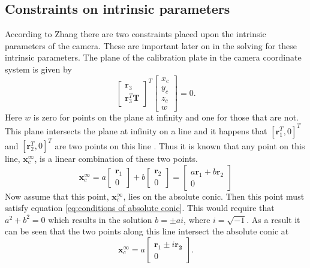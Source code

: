 \documentclass[12pt,oneside,openany,a4paper, %
english, %
masters-t, goldenblock]{usthesis}
\begin{document}
\subsection{Constraints on intrinsic parameters}
\label{sec: intrinsic constraints}
According to Zhang \cite{emerging} there are two constraints placed upon the intrinsic parameters of the camera. These are important later on in the solving for these intrinsic parameters. The plane of the calibration plate in the camera coordinate system is given by \cite{emerging} 
\begin{equation}
  \begin{bmatrix}
  \bm{r}_3 \\
  \bm{r}_3^T \bm{T}
  \end{bmatrix}^T
  \begin{bmatrix}
  x_c \\
  y_c \\
  z_c \\
  w
  \end{bmatrix} = 0.
\end{equation}
Here $w$ is zero for points on the plane at infinity and one for those that are not. This plane intersects the plane at infinity on a line and it happens that $[\bm{r}_1^T, 0]^T$ and $[\bm{r}_2^T, 0]^T$ are two points on this line \cite{emerging}. Thus it is known that any point on this line, $\bm{x}_c^{\infty}$, is a linear combination of these two points.
\begin{equation}
  \bm{x}_c^{\infty} = a \begin{bmatrix}
  \bm{r}_1 \\
  0
  \end{bmatrix} + b
  \begin{bmatrix}
  \bm{r}_2 \\
  0
  \end{bmatrix} =
  \begin{bmatrix}
  a \bm{r}_1 + b \bm{r}_2 \\
  0
  \end{bmatrix}
\end{equation}
Now assume that this point, $\bm{x}_c^{\infty}$, lies on the absolute conic. Then this point must satisfy equation \ref{eq:conditions of absolute conic}. This would require that $a^2+b^2=0$ which results in the solution $b=\pm a i$, where $i=\sqrt{-1}$. As a result it can be seen that the two points along this line intersect the absolute conic at
\begin{equation}
  \bm{x}_c^{\infty} = a 
  \begin{bmatrix}
  \bm{r}_1 \pm i \bm{r_2} \\
  0
  \end{bmatrix}.
\end{equation}
\end{document}
